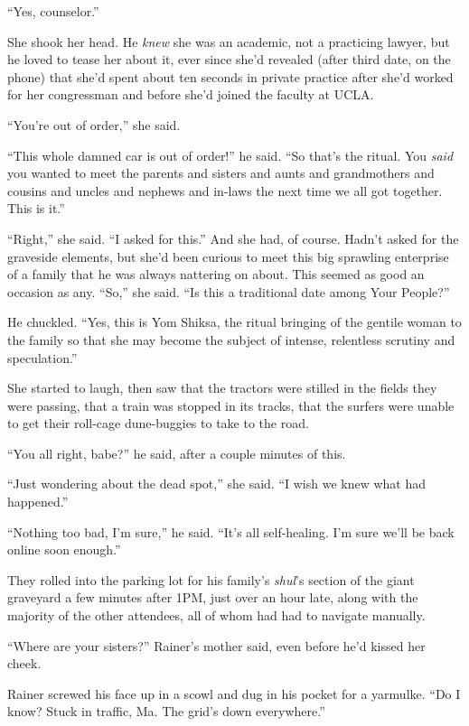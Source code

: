 “Yes, counselor.”

She shook her head. He \emph{knew} she was an academic, not a 
practicing lawyer, but he loved to tease her about it, ever since she'd 
revealed (after third date, on the phone) that she'd spent about ten 
seconds in private practice after she'd worked for her congressman and 
before she'd joined the faculty at UCLA.

“You're out of order,” she said.

“This whole damned car is out of order!” he said. “So that's the 
ritual. You \emph{said} you wanted to meet the parents and sisters and 
aunts and grandmothers and cousins and uncles and nephews and in-laws 
the next time we all got together. This is it.”

“Right,” she said. “I asked for this.” And she had, of course. 
Hadn't asked for the graveside elements, but she'd been curious to meet 
this big sprawling enterprise of a family that he was always nattering 
on about. This seemed as good an occasion as any. “So,” she said. 
“Is this a traditional date among Your People?”

He chuckled. “Yes, this is Yom Shiksa, the ritual bringing of the 
gentile woman to the family so that she may become the subject of 
intense, relentless scrutiny and speculation.”

She started to laugh, then saw that the tractors were stilled in the 
fields they were passing, that a train was stopped in its tracks, that 
the surfers were unable to get their roll-cage dune-buggies to take to 
the road.

“You all right, babe?” he said, after a couple minutes of this.

“Just wondering about the dead spot,” she said. “I wish we knew 
what had happened.”

“Nothing too bad, I'm sure,” he said. “It's all self-healing. I'm 
sure we'll be back online soon enough.”

\tb

They rolled into the parking lot for his family's \emph{shul}'s section 
of the giant graveyard a few minutes after 1PM, just over an hour late, 
along with the majority of the other attendees, all of whom had had to 
navigate manually.

“Where are your sisters?” Rainer's mother said, even before he'd 
kissed her cheek.

Rainer screwed his face up in a scowl and dug in his pocket for a 
yarmulke. “Do I know? Stuck in traffic, Ma. The grid's down 
everywhere.”

